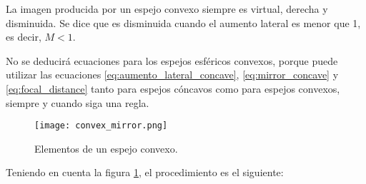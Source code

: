 La imagen producida por un espejo convexo siempre es virtual, derecha y disminuida. Se dice que es disminuida cuando el aumento lateral es menor que 1, es decir, \(M < 1\).

No se deducirá ecuaciones para los espejos esféricos convexos, porque puede utilizar las ecuaciones \ref{eq:aumento_lateral_concave}, \ref{eq:mirror_concave} y \ref{eq:focal_distance} tanto para espejos cóncavos como para espejos convexos, siempre y cuando siga una regla.

\begin{figure}[ht]
  \centering
  \texttt{[image: convex\_mirror.png]}
  \caption{Elementos de un espejo convexo.}
  \label{fig:convex_mirror}
\end{figure}
Teniendo en cuenta la figura \ref{fig:convex_mirror}, el procedimiento es el siguiente:
